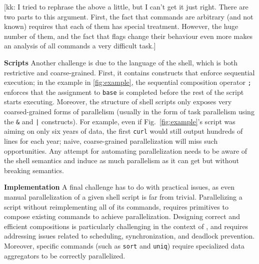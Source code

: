 \documentclass[letterpaper,twocolumn,10pt]{article}
\newcommand{\heading}[1]{\vspace{4pt}\noindent\textbf{#1}\enspace}
\newcommand{\ttt}[1]{\texttt{#1}}
\newcommand{\kk}[1]{[{\color{magenta}kk: #1}]}
\begin{document}
\kk{I tried to rephrase the above a little, but I can't get it just right. There are two parts to this argument. First, the fact that commands are arbitrary (and not known) requires that each of them has special treatment. However, the huge number of them, and the fact that flags change their behaviour even more makes an analysis of all commands a very difficult task.}


\heading{Scripts} %
Another challenge is due to the language of the shell, which
is both restrictive and coarse-grained.
First, it contains constructs that enforce sequential execution; in the example in \cref{fig:example}, the sequential composition operator \ttt{;} enforces that the assignment to \ttt{base} is completed before the rest of the script starts executing.
Moreover, the structure of shell scripts only exposes very coarsed-grained forms of parallelism (usually in the form of task parallelism using the \ttt{\&} and \ttt{|} constructs).
For example, even if Fig.~\ref{fig:example}'s script was aiming on only six years of data, the first \ttt{curl} would still output hundreds of lines for each year;
  naive, coarse-grained parallelization will miss such opportunities.
Any attempt for automating parallelization needs to be aware of the shell semantics and induce as much parallelism as it can get but without breaking semantics.

\heading{Implementation} %
%
A final challenge has to do with practical issues, as even manual
parallelization of a given shell script is far from
trivial. Parallelizing a script without reimplementing all of its
commands, requires primitives to compose existing commands to achieve
parallelization. Designing correct and efficient compositions is
particularly challenging in the context of \unix, and requires
addressing issues related to scheduling, synchronization, and deadlock
prevention. Moreover, specific commands (such as \ttt{sort} and
\ttt{uniq}) require specialized data aggregators to be correctly
parallelized.
\end{document}
